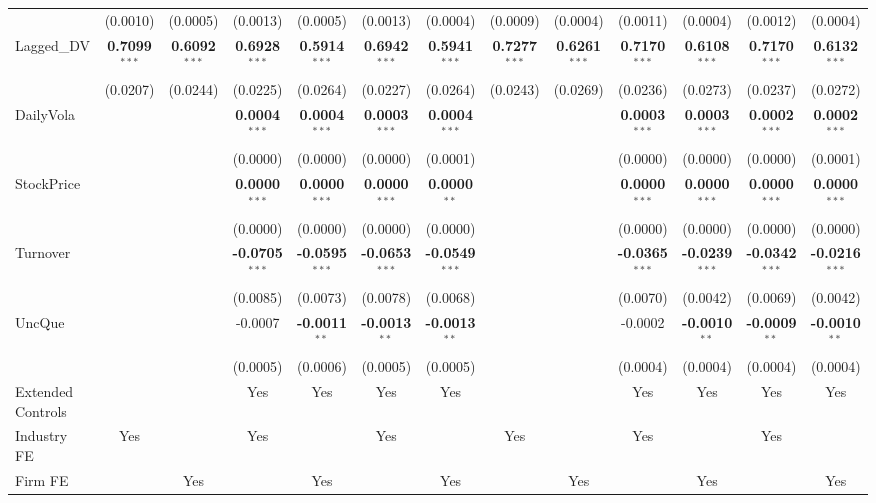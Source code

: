 \begin{landscape}
\begin{table}[H]
\begin{tabular}{lcccccccccccc}
 & (0.0010) & (0.0005) & (0.0013) & (0.0005) & (0.0013) & (0.0004) & (0.0009) & (0.0004) & (0.0011) & (0.0004) & (0.0012) & (0.0004) \\
Lagged\_DV & \textbf{0.7099}$^{***}$ & \textbf{0.6092}$^{***}$ & \textbf{0.6928}$^{***}$ & \textbf{0.5914}$^{***}$ & \textbf{0.6942}$^{***}$ & \textbf{0.5941}$^{***}$ & \textbf{0.7277}$^{***}$ & \textbf{0.6261}$^{***}$ & \textbf{0.7170}$^{***}$ & \textbf{0.6108}$^{***}$ & \textbf{0.7170}$^{***}$ & \textbf{0.6132}$^{***}$ \\
 & (0.0207) & (0.0244) & (0.0225) & (0.0264) & (0.0227) & (0.0264) & (0.0243) & (0.0269) & (0.0236) & (0.0273) & (0.0237) & (0.0272) \\
DailyVola &  &  & \textbf{0.0004}$^{***}$ & \textbf{0.0004}$^{***}$ & \textbf{0.0003}$^{***}$ & \textbf{0.0004}$^{***}$ &  &  & \textbf{0.0003}$^{***}$ & \textbf{0.0003}$^{***}$ & \textbf{0.0002}$^{***}$ & \textbf{0.0002}$^{***}$ \\
 &  &  & (0.0000) & (0.0000) & (0.0000) & (0.0001) &  &  & (0.0000) & (0.0000) & (0.0000) & (0.0001) \\
StockPrice &  &  & \textbf{0.0000}$^{***}$ & \textbf{0.0000}$^{***}$ & \textbf{0.0000}$^{***}$ & \textbf{0.0000}$^{**}$ &  &  & \textbf{0.0000}$^{***}$ & \textbf{0.0000}$^{***}$ & \textbf{0.0000}$^{***}$ & \textbf{0.0000}$^{***}$ \\
 &  &  & (0.0000) & (0.0000) & (0.0000) & (0.0000) &  &  & (0.0000) & (0.0000) & (0.0000) & (0.0000) \\
Turnover &  &  & \textbf{-0.0705}$^{***}$ & \textbf{-0.0595}$^{***}$ & \textbf{-0.0653}$^{***}$ & \textbf{-0.0549}$^{***}$ &  &  & \textbf{-0.0365}$^{***}$ & \textbf{-0.0239}$^{***}$ & \textbf{-0.0342}$^{***}$ & \textbf{-0.0216}$^{***}$ \\
 &  &  & (0.0085) & (0.0073) & (0.0078) & (0.0068) &  &  & (0.0070) & (0.0042) & (0.0069) & (0.0042) \\
UncQue &  &  & -0.0007 & \textbf{-0.0011}$^{**}$ & \textbf{-0.0013}$^{**}$ & \textbf{-0.0013}$^{**}$ &  &  & -0.0002 & \textbf{-0.0010}$^{**}$ & \textbf{-0.0009}$^{**}$ & \textbf{-0.0010}$^{**}$ \\
 &  &  & (0.0005) & (0.0006) & (0.0005) & (0.0005) &  &  & (0.0004) & (0.0004) & (0.0004) & (0.0004) \\
\midrule
Extended Controls &  &  & Yes & Yes & Yes & Yes &  &  & Yes & Yes & Yes & Yes \\
Industry FE & Yes &  & Yes &  & Yes &  & Yes &  & Yes &  & Yes &  \\
Firm FE &  & Yes &  & Yes &  & Yes &  & Yes &  & Yes &  & Yes \\

\end{tabular}
\end{table}
\end{landscape}
